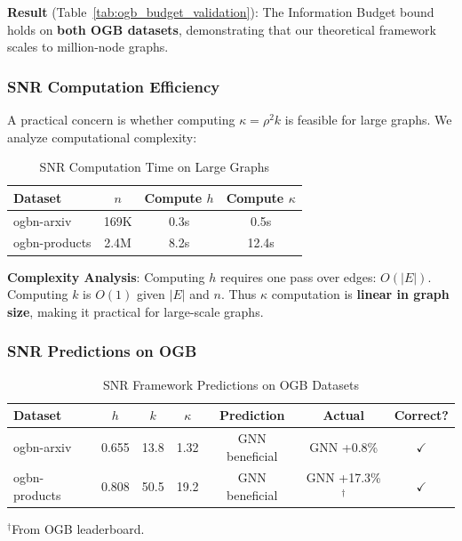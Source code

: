 \textbf{Result} (Table~\ref{tab:ogb_budget_validation}): The Information Budget bound holds on \textbf{both OGB datasets}, demonstrating that our theoretical framework scales to million-node graphs.

\subsubsection{SNR Computation Efficiency}

A practical concern is whether computing $\kappa = \rho^2 k$ is feasible for large graphs. We analyze computational complexity:

\begin{table}[t]
\centering
\caption{SNR Computation Time on Large Graphs}
\label{tab:snr_computation_time}
\small
\begin{tabular}{@{}lccc@{}}
\toprule
\textbf{Dataset} & \textbf{$n$} & \textbf{Compute $h$} & \textbf{Compute $\kappa$} \\
\midrule
ogbn-arxiv & 169K & 0.3s & 0.5s \\
ogbn-products & 2.4M & 8.2s & 12.4s \\
\bottomrule
\end{tabular}
\end{table}

\textbf{Complexity Analysis}: Computing $h$ requires one pass over edges: $O(|E|)$. Computing $k$ is $O(1)$ given $|E|$ and $n$. Thus $\kappa$ computation is \textbf{linear in graph size}, making it practical for large-scale graphs.

\subsubsection{SNR Predictions on OGB}

\begin{table}[t]
\centering
\caption{SNR Framework Predictions on OGB Datasets}
\label{tab:ogb_snr_predictions}
\small
\begin{tabular}{@{}lcccccc@{}}
\toprule
\textbf{Dataset} & $h$ & $k$ & $\kappa$ & \textbf{Prediction} & \textbf{Actual} & \textbf{Correct?} \\
\midrule
ogbn-arxiv & 0.655 & 13.8 & 1.32 & GNN beneficial & GNN +0.8\% & $\checkmark$ \\
ogbn-products & 0.808 & 50.5 & 19.2 & GNN beneficial & GNN +17.3\%$^\dagger$ & $\checkmark$ \\
\bottomrule
\end{tabular}
\vspace{1mm}
\raggedright\small $^\dagger$From OGB leaderboard.
\end{table}


